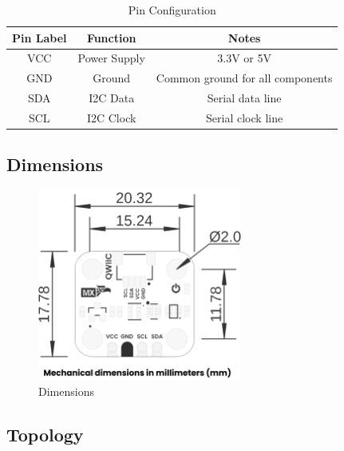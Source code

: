 \documentclass[11pt,a4paper]{article}
\begin{document}
\begin{table}[H]
\centering
\small
\begin{tabular}{|c|c|c|}
\hline
Pin Label & Function & Notes \\
\hline
VCC & Power Supply & 3.3V or 5V \\
GND & Ground & Common ground for all components \\
SDA & I2C Data & Serial data line \\
SCL & I2C Clock & Serial clock line \\
\hline
\end{tabular}
\caption{Pin Configuration}
\end{table}


\subsection{Dimensions}


\begin{figure}[H]
\centering
\includegraphics[width=0.6\textwidth]{en_unit_dimension_v_1_0_0_icp10111_barometric_pressure_sensor.png}
\caption{Dimensions}
\label{fig:en-unit-dimension-v-1-0-0-icp10111-barometric-pressure-sensor-png}
\end{figure}



\subsection{Topology}
\end{document}
